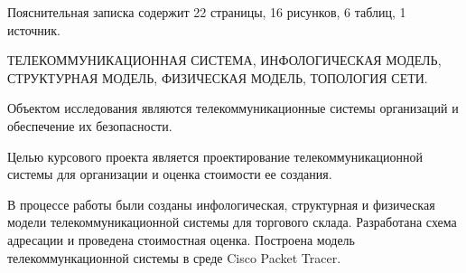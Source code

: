 
Пояснительная записка содержит 22 страницы, 16 рисунков, 6 таблиц, 1 источник.

ТЕЛЕКОММУНИКАЦИОННАЯ СИСТЕМА, ИНФОЛОГИЧЕСКАЯ МОДЕЛЬ, СТРУКТУРНАЯ МОДЕЛЬ, ФИЗИЧЕСКАЯ МОДЕЛЬ, ТОПОЛОГИЯ СЕТИ.

Объектом исследования являются телекоммуникационные системы организаций и обеспечение их безопасности.

Целью курсового проекта является проектирование телекоммуникационной системы для организации и оценка стоимости ее создания. 

В процессе работы были созданы инфологическая, структурная и физическая модели телекоммуникационной системы для торгового склада. Разработана схема адресации и проведена стоимостная оценка. Построена модель телекоммункационной системы в среде Cisco Packet Tracer.